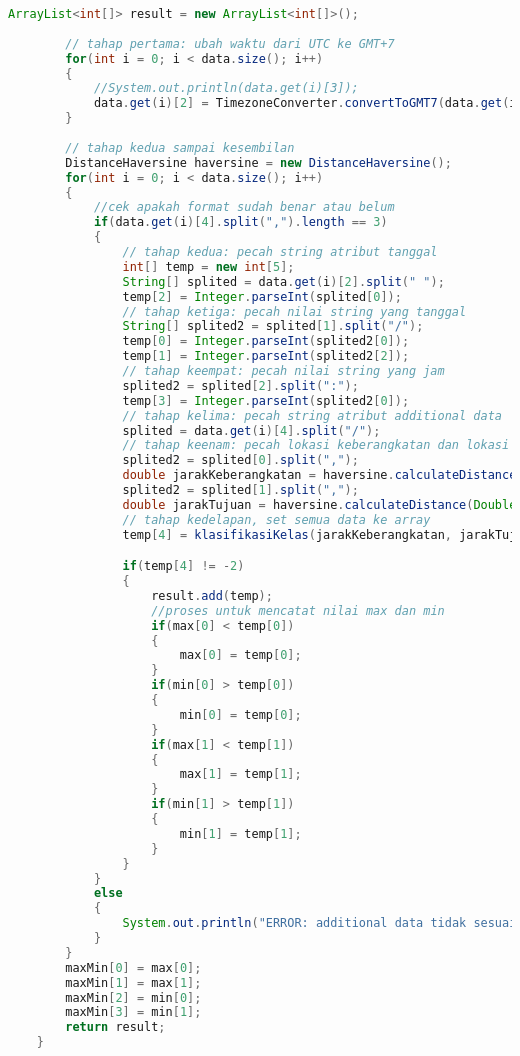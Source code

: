 \begin{lstlisting}[language=Java,basicstyle=\tiny,caption=ProcessingData.java]
        ArrayList<int[]> result = new ArrayList<int[]>();
        
        // tahap pertama: ubah waktu dari UTC ke GMT+7
        for(int i = 0; i < data.size(); i++)
        {
            //System.out.println(data.get(i)[3]);
            data.get(i)[2] = TimezoneConverter.convertToGMT7(data.get(i)[2]);
        }
        
        // tahap kedua sampai kesembilan
        DistanceHaversine haversine = new DistanceHaversine();
        for(int i = 0; i < data.size(); i++)
        {
            //cek apakah format sudah benar atau belum
            if(data.get(i)[4].split(",").length == 3)
            {
                // tahap kedua: pecah string atribut tanggal
                int[] temp = new int[5];
                String[] splited = data.get(i)[2].split(" ");
                temp[2] = Integer.parseInt(splited[0]);
                // tahap ketiga: pecah nilai string yang tanggal
                String[] splited2 = splited[1].split("/");
                temp[0] = Integer.parseInt(splited2[0]);
                temp[1] = Integer.parseInt(splited2[2]);
                // tahap keempat: pecah nilai string yang jam
                splited2 = splited[2].split(":");
                temp[3] = Integer.parseInt(splited2[0]);
                // tahap kelima: pecah string atribut additional data
                splited = data.get(i)[4].split("/");
                // tahap keenam: pecah lokasi keberangkatan dan lokasi tujuan untuk mendapatkan lat n lon dan (ini tahap ketujuh) menghitung jarak terhadap titik pusat
                splited2 = splited[0].split(",");
                double jarakKeberangkatan = haversine.calculateDistance(Double.parseDouble(splited2[0]), Double.parseDouble(splited2[1]), -6.916667,107.6) * 1000;
                splited2 = splited[1].split(",");
                double jarakTujuan = haversine.calculateDistance(Double.parseDouble(splited2[0]), Double.parseDouble(splited2[1]), -6.916667,107.6) * 1000;
                // tahap kedelapan, set semua data ke array
                temp[4] = klasifikasiKelas(jarakKeberangkatan, jarakTujuan);

                if(temp[4] != -2)
                {
                    result.add(temp);
                    //proses untuk mencatat nilai max dan min
                    if(max[0] < temp[0])
                    {
                        max[0] = temp[0];
                    }
                    if(min[0] > temp[0])
                    {
                        min[0] = temp[0];
                    }
                    if(max[1] < temp[1])
                    {
                        max[1] = temp[1];
                    }
                    if(min[1] > temp[1])
                    {
                        min[1] = temp[1];
                    }
                }
            }
            else
            {
                System.out.println("ERROR: additional data tidak sesuai; " + data.get(i)[4]);
            }
        }
        maxMin[0] = max[0];
        maxMin[1] = max[1];
        maxMin[2] = min[0];
        maxMin[3] = min[1];
        return result;
    }
    

\end{lstlisting}
